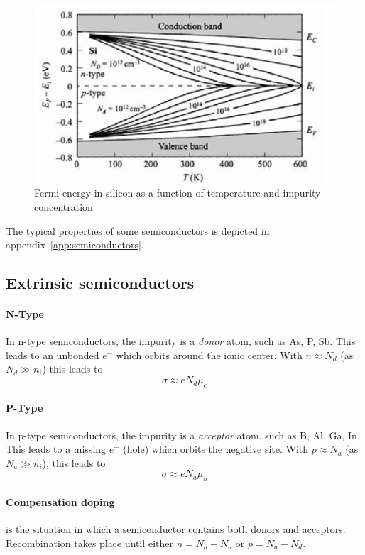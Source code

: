 \begin{figure}[htbp]
    \centering
    \includegraphics[width=0.6\linewidth]{images/semiconductors_fermi_energies.jpg}
    \caption{Fermi energy in silicon as a function of temperature and impurity concentration}
\end{figure}

The typical properties of some semiconductors is depicted in appendix~\ref{app:semiconductors}.

\subsection{Extrinsic semiconductors}
\paragraph{N-Type}
In n-type semiconductors, the impurity is a \emph{donor} atom, such as As, P, Sb.
This leads to an unbonded $e^-$ which orbits around the ionic center.
With $n \approx N_d$ (as $N_d \gg n_i$) this leads to
\begin{equation}
    \sigma \approx e N_d \mu_e
\end{equation}

\paragraph{P-Type}
In p-type semiconductors, the impurity is a \emph{acceptor} atom, such as B, Al, Ga, In.
This leads to a missing $e^-$ (hole) which orbits the negative site.
With $p \approx N_a$ (as $N_a \gg n_i$), this leads to
\begin{equation}
    \sigma \approx e N_a \mu_h
\end{equation}

\paragraph{Compensation doping}
is the situation in which a semiconductor contains both donors and acceptors.
Recombination takes place until either 
$n=N_d-N_a$ or $p=N_a-N_d$. 

